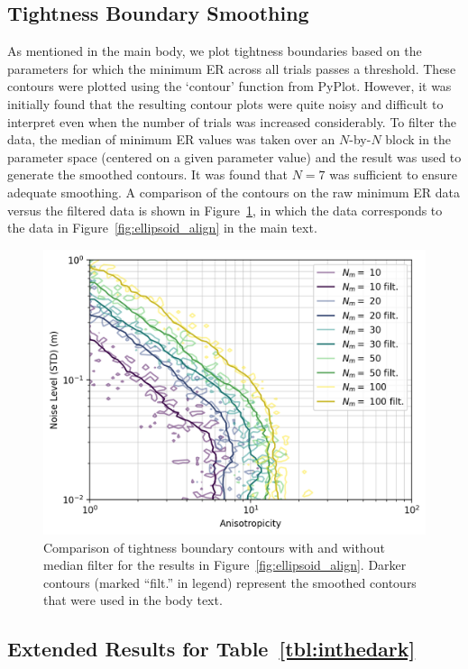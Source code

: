 \documentclass[lettersize,journal]{IEEEtran}
\begin{document}
\subsection{Tightness Boundary Smoothing}\label{App:Smoothing}

As mentioned in the main body, we plot tightness boundaries based on the parameters for which the minimum ER across all trials passes a threshold. These contours were plotted using the `contour' function from PyPlot.  However, it was initially found that the resulting contour plots were quite noisy and difficult to interpret even when the number of trials was increased considerably. To filter the data, the median of minimum ER  values was taken over an $N$-by-$N$ block in the parameter space (centered on a given parameter value) and the result was used to generate the smoothed contours. It was found that $N=7$ was sufficient to ensure adequate smoothing. A comparison of the contours on the raw minimum ER  data versus the filtered data is shown in Figure~\ref{fig:filter}, in which the data corresponds to the data in Figure~\ref{fig:ellipsoid_align} in the main text. 
\begin{figure}[!ht]
	\centering
	\includegraphics[width=\columnwidth]{figs/filter_compare}
	\caption{Comparison of tightness boundary contours with and without median filter for the results in Figure~\ref{fig:ellipsoid_align}. Darker contours (marked ``filt.'' in legend) represent the smoothed contours that were used in the body text.}
	\label{fig:filter}
\end{figure}


\subsection{Extended Results for Table~\ref{tbl:inthedark}}\label{App:inthedarkExt}
\end{document}
